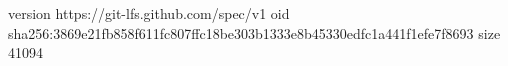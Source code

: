 version https://git-lfs.github.com/spec/v1
oid sha256:3869e21fb858f611fc807ffc18be303b1333e8b45330edfc1a441f1efe7f8693
size 41094
